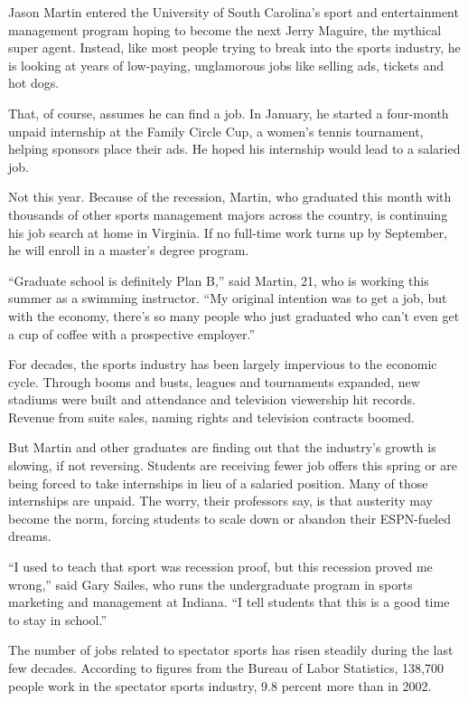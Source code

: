 \documentclass[12pt,a4paper,onecolumn]{article}
\begin{document}
Jason Martin entered the University of South Carolina's sport and entertainment management program
hoping to become the next Jerry Maguire, the mythical super agent. Instead, like most people trying
to break into the sports industry, he is looking at years of low-paying, unglamorous jobs like
selling ads, tickets and hot dogs.

That, of course, assumes he can find a job. In January, he started a four-month unpaid internship at
the Family Circle Cup, a women's tennis tournament, helping sponsors place their ads. He hoped his
internship would lead to a salaried job.

Not this year. Because of the recession, Martin, who graduated this month with thousands of other
sports management majors across the country, is continuing his job search at home in Virginia. If no
full-time work turns up by September, he will enroll in a master's degree program.

``Graduate school is definitely Plan B,'' said Martin, 21, who is working this summer as a swimming
instructor. ``My original intention was to get a job, but with the economy, there's so many people
who just graduated who can't even get a cup of coffee with a prospective employer.''

For decades, the sports industry has been largely impervious to the economic cycle. Through booms
and busts, leagues and tournaments expanded, new stadiums were built and attendance and television
viewership hit records. Revenue from suite sales, naming rights and television contracts boomed.

But Martin and other graduates are finding out that the industry's growth is slowing, if not
reversing. Students are receiving fewer job offers this spring or are being forced to take
internships in lieu of a salaried position. Many of those internships are unpaid. The worry, their
professors say, is that austerity may become the norm, forcing students to scale down or abandon
their ESPN-fueled dreams.

``I used to teach that sport was recession proof, but this recession proved me wrong,'' said Gary
Sailes, who runs the undergraduate program in sports marketing and management at Indiana. ``I tell
students that this is a good time to stay in school.''

The number of jobs related to spectator sports has risen steadily during the last few decades.
According to figures from the Bureau of Labor Statistics, 138,700 people work in the spectator
sports industry, 9.8 percent more than in 2002.
\end{document}
